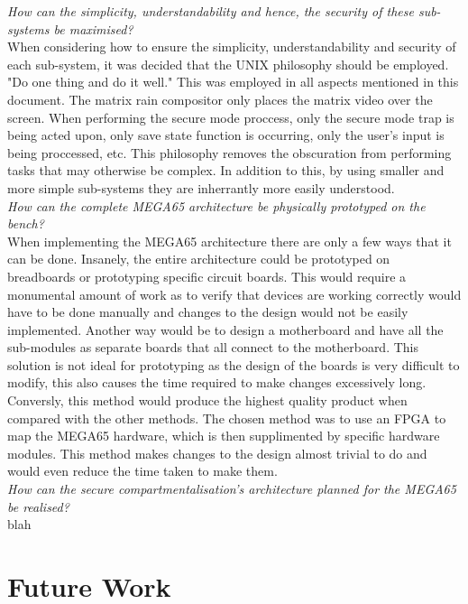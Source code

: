 \textit{How can the simplicity, understandability and hence, the security of these sub-systems be maximised?}\\
When considering how to ensure the simplicity, understandability and security of each sub-system, it was decided that the UNIX philosophy should be employed. "Do one thing and do it well." This was employed in all aspects mentioned in this document. The matrix rain compositor only places the matrix video over the screen. When performing the secure mode proccess, only the secure mode trap is being acted upon, only save state function is occurring, only the user's input is being proccessed, etc. This philosophy removes the obscuration from performing tasks that may otherwise be complex. In addition to this, by using smaller and more simple sub-systems they are inherrantly more easily understood. 
\\
\textit{How can the complete MEGA65 architecture be physically prototyped on the bench?}\\
When implementing the MEGA65 architecture there are only a few ways that it can be done. Insanely, the entire architecture could be prototyped on breadboards or prototyping specific circuit boards. This would require a monumental amount of work as to verify that devices are working correctly would have to be done manually and changes to the design would not be easily implemented. Another way would be to design a motherboard and have all the sub-modules as separate boards that all connect to the motherboard. This solution is not ideal for prototyping as the design of the boards is very difficult to modify, this also causes the time required to make changes excessively long. Conversly, this method would produce the highest quality product when compared with the other methods. The chosen method was to use an FPGA to map the MEGA65 hardware, which is then supplimented by specific hardware modules. This method makes changes to the design almost trivial to do and would even reduce the time taken to make them.
\\
\textit{How can the secure compartmentalisation's architecture planned for the MEGA65 be realised?}\\
blah
\\



\section{Future Work}
